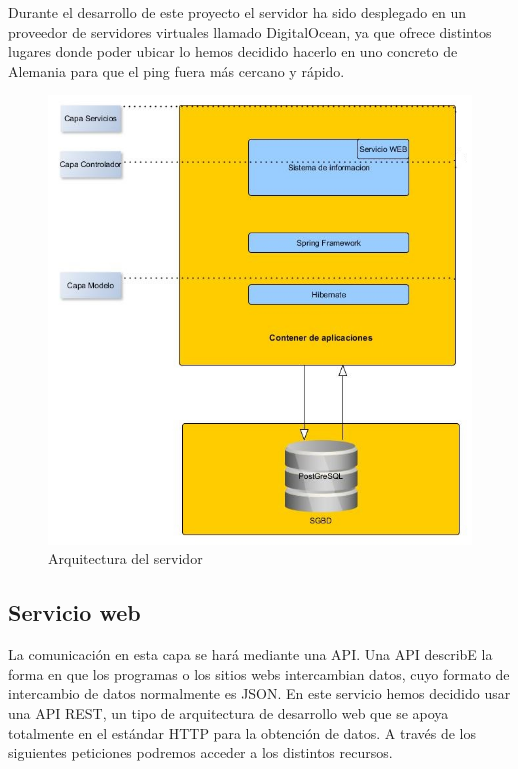Durante el desarrollo de este proyecto el servidor ha sido desplegado en un proveedor de servidores virtuales llamado 
  DigitalOcean, ya que ofrece distintos lugares donde poder ubicar lo hemos decidido hacerlo en uno concreto de Alemania para que el ping fuera más cercano y rápido.
\begin{figure}[H]
		\centering
		\includegraphics[width=\textwidth] {arquitectura-servidor.jpg}
		\caption{Arquitectura del servidor }
		\label{fig:arquitectura-servidor}
	\end{figure}


\subsection{Servicio web}
 La comunicación en esta capa se hará mediante una API. Una API describE la forma en que los programas o los sitios webs intercambian datos, cuyo formato  de intercambio de datos normalmente es JSON. En este servicio hemos decidido usar una API REST, un tipo de arquitectura de desarrollo web que se apoya totalmente en el estándar HTTP para la obtención de datos. A través de los siguientes peticiones podremos acceder a los distintos recursos.
 

